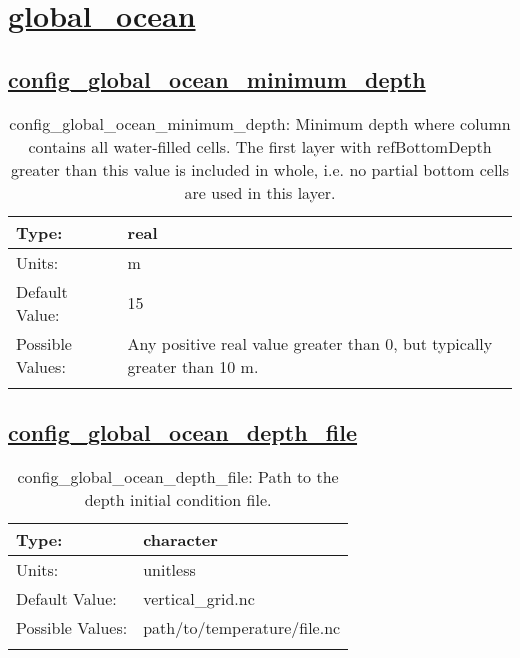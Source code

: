 \section[global\_ocean]{\hyperref[sec:nm_tab_global_ocean]{global\_ocean}}
\label{sec:nm_sec_global_ocean}
\subsection[config\_global\_ocean\_minimum\_depth]{\hyperref[sec:nm_tab_global_ocean]{config\_global\_ocean\_minimum\_depth}}
\label{subsec:nm_sec_config_global_ocean_minimum_depth}
\begin{center}
\begin{longtable}{| p{2.0in} || p{4.0in} |}
    \hline
    Type: & real \\
    \hline
    Units: & \si{m} \\
    \hline
    Default Value: & 15 \\
    \hline
    Possible Values: & Any positive real value greater than 0, but typically greater than 10 m. \\
    \hline
    \caption{config\_global\_ocean\_minimum\_depth: Minimum depth where column contains all water-filled cells.  The first layer with refBottomDepth greater than this value is included in whole, i.e. no partial bottom cells are used in this layer.}
\end{longtable}
\end{center}
\subsection[config\_global\_ocean\_depth\_file]{\hyperref[sec:nm_tab_global_ocean]{config\_global\_ocean\_depth\_file}}
\label{subsec:nm_sec_config_global_ocean_depth_file}
\begin{center}
\begin{longtable}{| p{2.0in} || p{4.0in} |}
    \hline
    Type: & character \\
    \hline
    Units: & \si{unitless} \\
    \hline
    Default Value: & vertical\_grid.nc \\
    \hline
    Possible Values: & path/to/temperature/file.nc \\
    \hline
    \caption{config\_global\_ocean\_depth\_file: Path to the depth initial condition file.}
\end{longtable}
\end{center}
